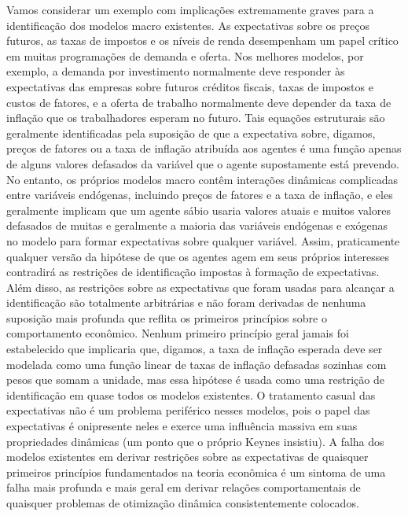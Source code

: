 \documentclass[12pt]{article}
\begin{document}
Vamos considerar um exemplo com implicações extremamente graves para a identificação dos modelos macro existentes. As expectativas sobre os preços futuros, as taxas de impostos e os níveis de renda desempenham um papel crítico em muitas programações de demanda e oferta. Nos melhores modelos, por exemplo, a demanda por investimento normalmente deve responder às expectativas das empresas sobre futuros créditos fiscais, taxas de impostos e custos de fatores, e a oferta de trabalho normalmente deve depender da taxa de inflação que os trabalhadores esperam no futuro. Tais equações estruturais são geralmente identificadas pela suposição de que a expectativa sobre, digamos, preços de fatores ou a taxa de inflação atribuída aos agentes é uma função apenas de alguns valores defasados da variável que o agente supostamente está prevendo. No entanto, os próprios modelos macro contêm interações dinâmicas complicadas entre variáveis endógenas, incluindo preços de fatores e a taxa de inflação, e eles geralmente implicam que um agente sábio usaria valores atuais e muitos valores defasados de muitas e geralmente a maioria das variáveis endógenas e exógenas no modelo para formar expectativas sobre qualquer variável. Assim, praticamente qualquer versão da hipótese de que os agentes agem em seus próprios interesses contradirá as restrições de identificação impostas à formação de expectativas. Além disso, as restrições sobre as expectativas que foram usadas para alcançar a identificação são totalmente arbitrárias e não foram derivadas de nenhuma suposição mais profunda que reflita os primeiros princípios sobre o comportamento econômico. Nenhum primeiro princípio geral jamais foi estabelecido que implicaria que, digamos, a taxa de inflação esperada deve ser modelada como uma função linear de taxas de inflação defasadas sozinhas com pesos que somam a unidade, mas essa hipótese é usada como uma restrição de identificação em quase todos os modelos existentes. O tratamento casual das expectativas não é um problema periférico nesses modelos, pois o papel das expectativas é onipresente neles e exerce uma influência massiva em suas propriedades dinâmicas (um ponto que o próprio Keynes insistiu). A falha dos modelos existentes em derivar restrições sobre as expectativas de quaisquer primeiros princípios fundamentados na teoria econômica é um sintoma de uma falha mais profunda e mais geral em derivar relações comportamentais de quaisquer problemas de otimização dinâmica consistentemente colocados.
\end{document}
